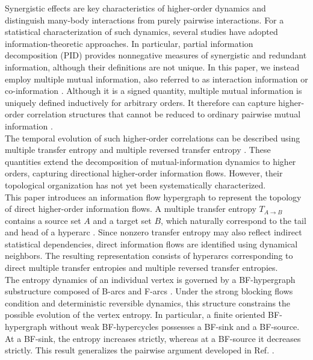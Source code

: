 \documentclass{comnet}%
\begin{document}
Synergistic effects are key characteristics of higher-order dynamics \cite{Battiston2020,Battiston2021,Rosas2022,Gallo2022,Majhi2022,Zhang2023,Bick2023} and distinguish many-body interactions from purely pairwise interactions. For a statistical characterization of such dynamics, several studies \cite{Matsuda2000,Schneidman2003,Rosas2019,Williams2010} have adopted information-theoretic approaches. In particular, partial information decomposition (PID) \cite{Williams2010,Kolchinsky2022} provides nonnegative measures of synergistic and redundant information, although their definitions are not unique. In this paper, we instead employ  multiple mutual information, also referred to as interaction information or co-information \cite{McGill1954,Fano1949,Ting1962,Han1980,Yeung1991,Matsuda2000,Bell2003,Krippendorff2009}. Although it is a signed quantity, multiple mutual information is uniquely defined inductively for arbitrary orders. It therefore can capture higher-order correlation structures that cannot be reduced to ordinary pairwise mutual information \cite{Matsuda2000,Schneidman2003}.\\

The temporal evolution of such higher-order correlations can be described using multiple transfer entropy and multiple reversed transfer entropy \cite{Lee2026a}. These quantities extend the decomposition of mutual-information dynamics to higher orders, capturing directional higher-order information flows. However, their topological organization has not yet been systematically characterized.\\

This paper introduces an information flow hypergraph to represent the topology of direct higher-order information flows. A multiple transfer entropy $T_{A \to B}$ contains a source set $A$ and a target set $B$, which naturally correspond to the tail and head of a hyperarc \cite{Gallo1993,Nguyen1998,Bretto2013}. Since nonzero transfer entropy may also reflect indirect statistical dependencies, direct information flows are identified using dynamical neighbors. The resulting representation consists of hyperarcs corresponding to direct multiple transfer entropies and multiple reversed transfer entropies.\\

The entropy dynamics of an individual vertex is governed by a BF-hypergraph substructure composed of B-arcs and F-arcs \cite{Gallo1993,Nguyen1998,Steinmetz2019}. Under the strong blocking flows condition and deterministic reversible dynamics, this structure constrains the possible evolution of the vertex entropy. In particular, a finite oriented BF-hypergraph without weak BF-hypercycles possesses a BF-sink and a BF-source. At a BF-sink, the entropy increases strictly, whereas at a BF-source it decreases strictly. This result generalizes the pairwise argument developed in Ref. \cite{Lee2026b}.\\
\end{document}
